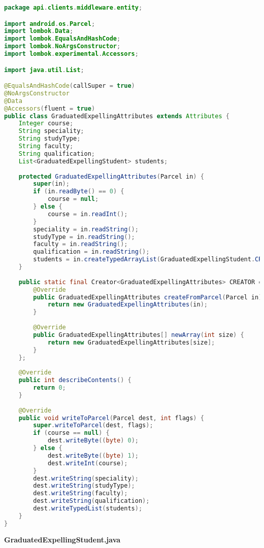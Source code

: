 \begin{lstlisting}[language=Java]
package api.clients.middleware.entity;

import android.os.Parcel;
import lombok.Data;
import lombok.EqualsAndHashCode;
import lombok.NoArgsConstructor;
import lombok.experimental.Accessors;

import java.util.List;

@EqualsAndHashCode(callSuper = true)
@NoArgsConstructor
@Data
@Accessors(fluent = true)
public class GraduatedExpellingAttributes extends Attributes {
	Integer course;
	String speciality;
	String studyType;
	String faculty;
	String qualification;
	List<GraduatedExpellingStudent> students;
	
	protected GraduatedExpellingAttributes(Parcel in) {
		super(in);
		if (in.readByte() == 0) {
			course = null;
		} else {
			course = in.readInt();
		}
		speciality = in.readString();
		studyType = in.readString();
		faculty = in.readString();
		qualification = in.readString();
		students = in.createTypedArrayList(GraduatedExpellingStudent.CREATOR);
	}
	
	public static final Creator<GraduatedExpellingAttributes> CREATOR = new Creator<GraduatedExpellingAttributes>() {
		@Override
		public GraduatedExpellingAttributes createFromParcel(Parcel in) {
			return new GraduatedExpellingAttributes(in);
		}
		
		@Override
		public GraduatedExpellingAttributes[] newArray(int size) {
			return new GraduatedExpellingAttributes[size];
		}
	};
	
	@Override
	public int describeContents() {
		return 0;
	}
	
	@Override
	public void writeToParcel(Parcel dest, int flags) {
		super.writeToParcel(dest, flags);
		if (course == null) {
			dest.writeByte((byte) 0);
		} else {
			dest.writeByte((byte) 1);
			dest.writeInt(course);
		}
		dest.writeString(speciality);
		dest.writeString(studyType);
		dest.writeString(faculty);
		dest.writeString(qualification);
		dest.writeTypedList(students);
	}
}

\end{lstlisting}
\textbf{GraduatedExpellingStudent.java}

